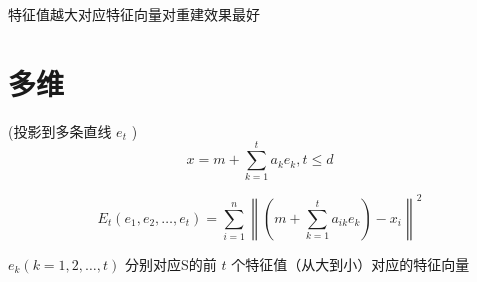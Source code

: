 特征值越大对应特征向量对重建效果最好

\section{多维}

(投影到多条直线 $ e_{{t}} $ )
\begin{equation}
x=m+\sum_{k=1}^{t} a_{k} e_{k}, t \leq d
\end{equation}

\begin{equation} E_{t}\left(e_{1}, e_{2}, \ldots, e_{t}\right)=\sum_{i=1}^{n}\left\|\left(m+\sum_{k=1}^{t} a_{i k} e_{k}\right)-x_{i}\right\|^{2} \end{equation}

$ e_{k}(k=1,2, \ldots, t) $ 分别对应S的前 $ t $ 个特征值（从大到小）对应的特征向量